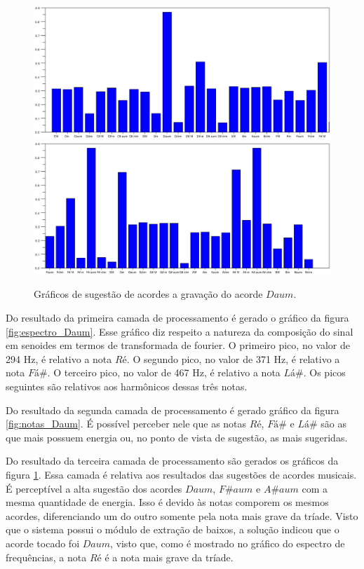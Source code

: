 \begin{figure}[h]
	\centering
		\includegraphics[keepaspectratio=true,scale=0.49]{figuras/Dm/acordes_1_Daum.eps}
		\includegraphics[keepaspectratio=true,scale=0.49]{figuras/Dm/acordes_2_Daum.eps}
	\caption{Gráficos de sugestão de acordes a gravação do acorde $Daum$.}
  \label{fig:acordes_Daum}
\end{figure}


Do resultado da primeira camada de processamento é gerado o gráfico da figura \ref{fig:espectro_Daum}. Esse gráfico diz respeito a natureza da composição do sinal em senoides em termos de transformada de fourier. O primeiro pico, no valor de 294 Hz, é relativo a nota $Ré$. O segundo pico, no valor de 371 Hz, é relativo a nota $Fá\#$. O terceiro pico, no valor de 467 Hz, é relativo a nota $Lá\#$. Os picos seguintes são relativos aos harmônicos dessas três notas.

Do resultado da segunda camada de processamento é gerado gráfico da figura \ref{fig:notas_Daum}. É possível perceber nele que as notas $Ré$, $Fá\#$ e $Lá\#$ são as que mais possuem energia ou, no ponto de vista de sugestão, as mais sugeridas.

Do resultado da terceira camada de processamento são gerados os gráficos da figura \ref{fig:acordes_Daum}. Essa camada é relativa aos resultados das sugestões de acordes musicais. É perceptível a alta sugestão dos acordes $Daum$, $F\#aum$ e $A\#aum$ com a mesma quantidade de energia. Isso é devido às notas comporem os mesmos acordes, diferenciando um do outro somente pela nota mais grave da tríade. Visto que o sistema possui o módulo de extração de baixos, a solução indicou que o acorde tocado foi $Daum$, visto que, como é mostrado no gráfico do espectro de frequências, a nota $Ré$ é a nota mais grave da tríade.

